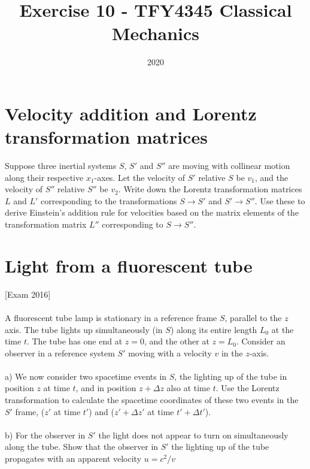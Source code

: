 \documentclass{article}
\title{Exercise 10 - TFY4345 Classical Mechanics}
\date{2020}
\begin{document}
    \maketitle
    \section{Velocity addition and Lorentz transformation matrices}
    Suppose three inertial systems $S, \, S'$ and $S''$ are moving with collinear motion along their respective $x_1$-axes. Let the velocity of $S'$ relative $S$ be $v_1$, and the velocity of $S''$ relative $S''$ be $v_2$. Write down the Lorentz transformation matrices $L$ and $L'$ corresponding to the transformations $S \rightarrow S'$ and $S' \rightarrow S''$. Use these to derive Einstein's addition rule for velocities based on the matrix elements of the transformation matrix $L''$ corresponding to $S \rightarrow S''$. \newline {} 
    \section{Light from a fluorescent tube}
        [Exam 2016] \\ \\
        A fluorescent tube lamp is stationary in a reference frame $S$, parallel to the $z$ axis. The tube lights up simultaneously (in $S$) along its entire length $L_0$ at the time $t$. The tube has one end at $z=0$, and the other at $z = L_0$. Consider an observer in a reference system $S'$ moving with a velocity $v$ in the $z$-axis. \\ \\
        a) We now consider two spacetime events in $S$, the lighting up of the tube in position $z$ at time $t$, and in position $z + \Delta z$ also at time $t$. Use the Lorentz transformation to calculate the spacetime coordinates of these two events in the $S'$ frame, ($z'$ at time $t'$) and ($z' + \Delta z'$ at time $t' + \Delta t'$). \\ \\
        b) For the observer in $S'$ the light does not appear to turn on simultaneously along the tube. Show that the observer in $S'$ the lighting up of the tube propagates with an apparent velocity $u = c^2/v$
\end{document}
